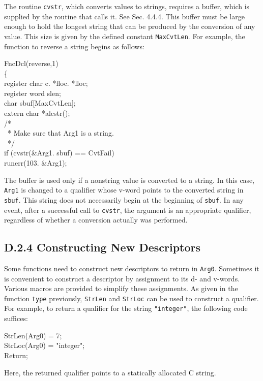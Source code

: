 The routine \texttt{cvstr}, which converts values to strings, requires a buffer,
which is supplied by the routine that calls it.  See Sec. 4.4.4. This buffer
must be large enough to hold the longest string that can be produced by the
conversion of any value. This size is given by the defined constant
\texttt{MaxCvtLen}. For example, the function to reverse a string begins as
follows:

\goodbreak
\begin{iconcode}
\color{red}FncDcl(reverse,1)\\
\{\\
\>register char c. *floc. *lloc;\\
\>register word slen;\\
\>char sbuf[MaxCvtLen];\\
\>extern char *alcstr();\\
\>/*\\
\>\ * Make sure that Arg1 is a string.\\
\>\ */\\
\>if (cvstr(\&Arg1. sbuf) == CvtFail)\\
\>\>runerr(103. \&Arg1);
\end{iconcode}

\noindent
The buffer is used only if a nonstring value is converted to a string. In this
case, \texttt{Arg1} is changed to a qualifier whose v-word points to the
converted string in \texttt{sbuf}. This string does not necessarily begin at the
beginning of \texttt{sbuf}. In any event, after a successful call to
\texttt{cvstr}, the argument is an appropriate qualifier, regardless of whether
a conversion actually was performed.

\subsection[D.2.4 Constructing New Descriptors]{D.2.4 Constructing New Descriptors}

Some functions need to construct new descriptors to return in \texttt{Arg0}.
Sometimes it is convenient to construct a descriptor by assignment to its d- and
v-words. Various macros are provided to simplify these assignments. As given in
the function \texttt{type} previously, \texttt{StrLen} and \texttt{StrLoc} can
be used to construct a qualifier. For example, to return a qualifier for the
string \texttt{"integer"}, the following code suffices:
\goodbreak
\begin{iconcode}
StrLen(Arg0) = 7;\\
StrLoc(Arg0) = "integer";\\
Return;
\end{iconcode}
\noindent
Here, the returned qualifier points to a statically allocated C string.

